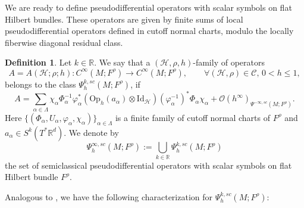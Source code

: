 \documentclass[11pt,oneside,reqno]{amsart}
\newcommand\R{\ensuremath{\mathbb{R}}}
\newcommand\Oph{\ensuremath{\mathrm{Op}_h}}
\theoremstyle{definition}
\newtheorem{definition}{Definition}[section]
\numberwithin{equation}{section}
\theoremstyle{plain}
\begin{document}
We are ready to define pseudodifferential operators with scalar symbols on flat Hilbert bundles. These operators are given by finite sums of local pseudodifferential operators defined in cutoff normal charts, modulo the locally fiberwise diagonal residual class.



\begin{definition}\label{defofscalarsemipseudo}
Let $k \in \mathbb{R}$. We say that a $(\mathcal{H},\rho,h)$-family of operators 
\begin{equation*}
     A = A(\mathcal{H};\rho;h) : C^{\infty}(M;F^{\rho}) \to C^\infty(M;F^{\rho}) , \qquad \forall  (\mathcal{H},\rho) \in \mathcal{C},\, 0<h\leq 1,
\end{equation*}
belongs to the class $\Psi_{h}^{k,sc}(M;F^\rho)$, if
\begin{equation}\label{defformpseudo}
A=\sum_{\alpha\in \Lambda} \chi_{\alpha }\Phi_{\alpha}^{-1} \varphi_{\alpha}^*( \Oph(a_{\alpha})\otimes \mathrm{Id}_{\mathcal{H}})(\varphi_{\alpha}^{-1})^* \Phi_{\alpha}\chi_{\alpha}  +  \mathcal{O}(h^{\infty})_{\Psi^{-\infty,sc}(M;F^\rho)}.
\end{equation}
Here $ \{ (\Phi_{\alpha}, U_{\alpha}, \varphi_{\alpha},\chi_{\alpha} ) \}_{\alpha\in \Lambda}$ is a finite family of cutoff normal charts of $F^\rho$ and $a_{\alpha}\in S^{k}(T^*\mathbb{R}^d)$. We denote by
\begin{equation*}
    \Psi^{\infty,sc}_h(M;F^{\rho}):=\bigcup\limits_{k\in \R} \Psi^{k,sc}_h(M;F^{\rho})
\end{equation*}
the set of semiclassical pseudodifferential operators with scalar symbols on flat Hilbert bundle $F^{\rho}$.
\end{definition}

Analogous to \cite[Proposition E.13]{dyatlovzworski2019resonances}, we have the following characterization for $\Psi^{k,sc}_{h}(M;F^{\rho})$:
\end{document}
